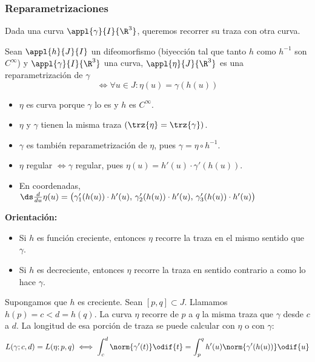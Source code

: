 \subsubsection{Reparametrizaciones}

Dada una curva $\appl{\gamma}{I}{\R^3}$, queremos recorrer su traza con otra curva.
\begin{defn}
	Sean $\appl{h}{J}{I}$ un difeomorfismo (biyección tal que tanto $h$ como $h^{-1}$ son $C^\infty$) y $\appl{\gamma}{I}{\R^3}$ una curva, $\appl{\eta}{J}{\R^3}$ es una reparametrización de $\gamma$
	\[ \iff \forall u \in J : \eta(u)=\gamma(h(u))\]
	\begin{itemize}[topsep=1pt, itemsep=1pt,parsep=3pt]
		\item $\eta$ es curva porque $\gamma$ lo es y $h$ es $C^\infty$.
		\item $\eta$ y $\gamma$ tienen la misma traza $(\trz{\eta}=\trz{\gamma})$.
		\item $\gamma$ es también reparametrización de $\eta$, pues $\gamma = \eta \circ h^{-1}$.
		\item $\eta$ regular $\iff \gamma$ regular, pues $\eta(u) = h'(u)\cdot\gamma'(h(u))$.
		\item En coordenadas, $\ds \frac{d}{du}\eta(u)=\big(\gamma_1'(h(u))\cdot h'(u),\, \gamma_2'(h(u))\cdot h'(u),\, \gamma_3'(h(u))\cdot h'(u)\big)$
	\end{itemize}
\end{defn}
\noindent \textbf{Orientación:}
\begin{itemize}[topsep=0pt, itemsep=1pt,parsep=3pt]
	\item Si $h$ es función creciente, entonces $\eta$ recorre la traza en el mismo sentido que $\gamma$.
	\item Si $h$ es decreciente, entonces $\eta$ recorre la traza en sentido contrario a como lo hace $\gamma$.
\end{itemize}
Supongamos que $h$ es creciente. Sean $\left[p, q\right]\subset J$. Llamamos $h(p)=c<d=h(q)$. La curva $\eta$ recorre de $p$ a $q$ la misma traza que $\gamma$ desde $c$ a $d$. La longitud de esa porción de traza se puede calcular con $\eta$ o con $\gamma$:
\[L(\gamma; c, d)=L(\eta; p, q) \iff \int_c^d\norm{\gamma'(t)}\odif{t}=\int_p^qh'(u)\norm{\gamma'(h(u))}\odif{u}\]

